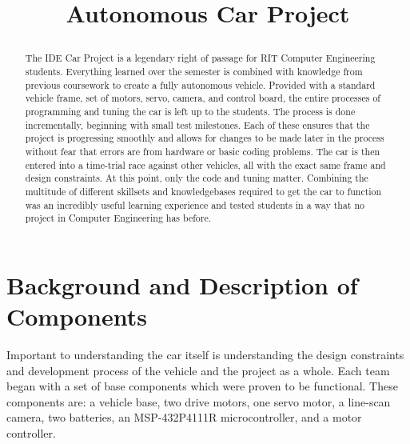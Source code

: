 \documentclass[conference]{IEEEtran}
\begin{document}
\title{Autonomous Car Project\\

\author{
\and
{}
}
}

\maketitle

\begin{abstract}
    The IDE Car Project is a legendary right of passage for RIT Computer
    Engineering students. Everything learned over the semester is combined
    with knowledge from previous coursework to create a fully autonomous
    vehicle. Provided with a standard vehicle frame, set of motors, servo,
    camera, and control board, the entire processes of programming and tuning
    the car is left up to the students. The process is done incrementally,
    beginning with small test milestones. Each of these ensures that the
    project is progressing smoothly and allows for changes to be made later in
    the process without fear that errors are from hardware or basic coding
    problems. The car is then entered into a time-trial race against other
    vehicles, all with the exact same frame and design constraints. At this
    point, only the code and tuning matter. Combining the multitude of
    different skillsets and knowledgebases required to get the car to function
    was an incredibly useful learning experience and tested students in a way
    that no project in Computer Engineering has before.
\end{abstract}

\section{Background and Description of Components}
    Important to understanding the car itself is understanding the design
    constraints and development process of the vehicle and the project as a
    whole. Each team began with a set of base components which were proven to
    be functional. These components are: a vehicle base, two drive motors,
    one servo motor, a line-scan camera, two batteries, an MSP-432P4111R
    microcontroller, and a motor controller.
\end{document}
